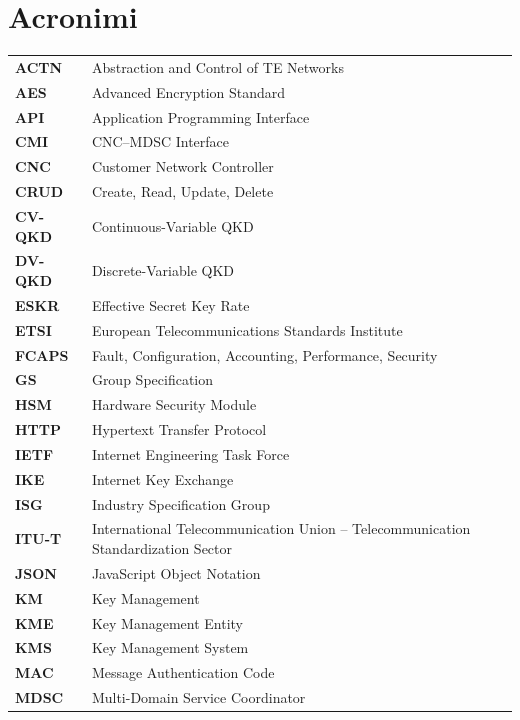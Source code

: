 \section*{Acronimi}

\begin{longtable}{@{}p{2.6cm}p{12.6cm}@{}}
\textbf{ACTN} & Abstraction and Control of TE Networks \\
\textbf{AES} & Advanced Encryption Standard \\
\textbf{API} & Application Programming Interface \\
\textbf{CMI} & CNC--MDSC Interface \\
\textbf{CNC} & Customer Network Controller \\
\textbf{CRUD} & Create, Read, Update, Delete \\
\textbf{CV-QKD} & Continuous-Variable QKD \\
\textbf{DV-QKD} & Discrete-Variable QKD \\
\textbf{ESKR} & Effective Secret Key Rate \\
\textbf{ETSI} & European Telecommunications Standards Institute \\
\textbf{FCAPS} & Fault, Configuration, Accounting, Performance, Security \\
\textbf{GS} & Group Specification \\
\textbf{HSM} & Hardware Security Module \\
\textbf{HTTP} & Hypertext Transfer Protocol \\
\textbf{IETF} & Internet Engineering Task Force \\
\textbf{IKE} & Internet Key Exchange \\
\textbf{ISG} & Industry Specification Group \\
\textbf{ITU-T} & International Telecommunication Union -- Telecommunication Standardization Sector \\
\textbf{JSON} & JavaScript Object Notation \\
\textbf{KM} & Key Management \\
\textbf{KME} & Key Management Entity \\
\textbf{KMS} & Key Management System \\
\textbf{MAC} & Message Authentication Code \\
\textbf{MDSC} & Multi-Domain Service Coordinator \\

\end{longtable}
